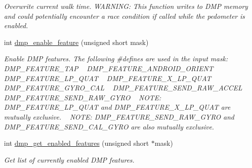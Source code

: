 \begin{DoxyCompactItemize}
\begin{DoxyCompactList}\small\item\em Overwrite current walk time. W\+A\+R\+N\+I\+NG\+: This function writes to D\+MP memory and could potentially encounter a race condition if called while the pedometer is enabled. \end{DoxyCompactList}\item 
int \hyperlink{group___d_r_i_v_e_r_s_ga70c485bdfa30515e5b869b081192caa1}{dmp\+\_\+enable\+\_\+feature} (unsigned short mask)
\begin{DoxyCompactList}\small\item\em Enable D\+MP features. The following \#define\textquotesingle{}s are used in the input mask\+: ~\newline
 D\+M\+P\+\_\+\+F\+E\+A\+T\+U\+R\+E\+\_\+\+T\+AP ~\newline
 D\+M\+P\+\_\+\+F\+E\+A\+T\+U\+R\+E\+\_\+\+A\+N\+D\+R\+O\+I\+D\+\_\+\+O\+R\+I\+E\+NT ~\newline
 D\+M\+P\+\_\+\+F\+E\+A\+T\+U\+R\+E\+\_\+\+L\+P\+\_\+\+Q\+U\+AT ~\newline
 D\+M\+P\+\_\+\+F\+E\+A\+T\+U\+R\+E\+\_\+X\+\_\+\+L\+P\+\_\+\+Q\+U\+AT ~\newline
 D\+M\+P\+\_\+\+F\+E\+A\+T\+U\+R\+E\+\_\+\+G\+Y\+R\+O\+\_\+\+C\+AL ~\newline
 D\+M\+P\+\_\+\+F\+E\+A\+T\+U\+R\+E\+\_\+\+S\+E\+N\+D\+\_\+\+R\+A\+W\+\_\+\+A\+C\+C\+EL ~\newline
 D\+M\+P\+\_\+\+F\+E\+A\+T\+U\+R\+E\+\_\+\+S\+E\+N\+D\+\_\+\+R\+A\+W\+\_\+\+G\+Y\+RO ~\newline
 N\+O\+TE\+: D\+M\+P\+\_\+\+F\+E\+A\+T\+U\+R\+E\+\_\+\+L\+P\+\_\+\+Q\+U\+AT and D\+M\+P\+\_\+\+F\+E\+A\+T\+U\+R\+E\+\_\+X\+\_\+\+L\+P\+\_\+\+Q\+U\+AT are mutually exclusive. ~\newline
 N\+O\+TE\+: D\+M\+P\+\_\+\+F\+E\+A\+T\+U\+R\+E\+\_\+\+S\+E\+N\+D\+\_\+\+R\+A\+W\+\_\+\+G\+Y\+RO and D\+M\+P\+\_\+\+F\+E\+A\+T\+U\+R\+E\+\_\+\+S\+E\+N\+D\+\_\+\+C\+A\+L\+\_\+\+G\+Y\+RO are also mutually exclusive. \end{DoxyCompactList}\item 
int \hyperlink{group___d_r_i_v_e_r_s_ga92b920b72f5146ea14d45ad2d529b64c}{dmp\+\_\+get\+\_\+enabled\+\_\+features} (unsigned short $\ast$mask)
\begin{DoxyCompactList}\small\item\em Get list of currently enabled D\+MP features. \end{DoxyCompactList}\item 

\end{DoxyCompactItemize}
